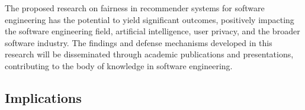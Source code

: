 
The proposed research on fairness %
in recommender systems for software engineering has the potential to yield significant outcomes, %
positively impacting the software engineering field, artificial intelligence, user privacy, and the broader software industry. 
The findings and defense mechanisms developed in this research will be disseminated through academic publications and presentations, contributing to the body of knowledge in software engineering. %
\vspace{-.4cm}
\subsection{Implications}







